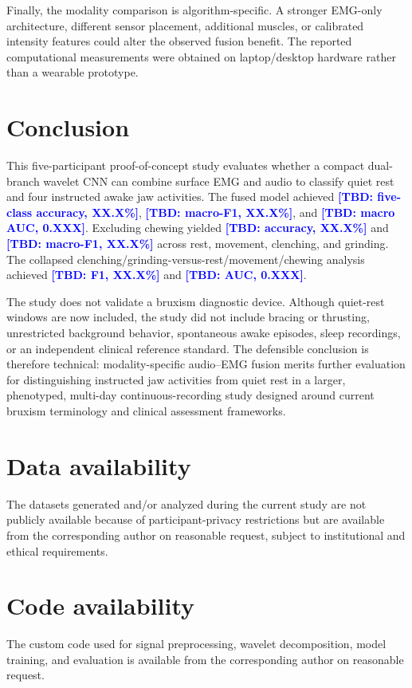 \documentclass[pdflatex,sn-nature,iicol]{sn-jnl}
\newcommand{\TBD}[1]{\textcolor{blue}{\textbf{[TBD: #1]}}}
\begin{document}
\color{blue}
Finally, the modality comparison is algorithm-specific. A stronger EMG-only architecture, different sensor placement, additional muscles, or calibrated intensity features could alter the observed fusion benefit. The reported computational measurements were obtained on laptop/desktop hardware rather than a wearable prototype.
\color{black}

\color{blue}
\section{Conclusion}
\color{black}

\color{blue}
This five-participant proof-of-concept study evaluates whether a compact dual-branch wavelet CNN can combine surface EMG and audio to classify quiet rest and four instructed awake jaw activities. The fused model achieved \TBD{five-class accuracy, XX.X\%}, \TBD{macro-F1, XX.X\%}, and \TBD{macro AUC, 0.XXX}. Excluding chewing yielded \TBD{accuracy, XX.X\%} and \TBD{macro-F1, XX.X\%} across rest, movement, clenching, and grinding. The collapsed clenching/grinding-versus-rest/movement/chewing analysis achieved \TBD{F1, XX.X\%} and \TBD{AUC, 0.XXX}.
\color{black}

\color{blue}
The study does not validate a bruxism diagnostic device. Although quiet-rest windows are now included, the study did not include bracing or thrusting, unrestricted background behavior, spontaneous awake episodes, sleep recordings, or an independent clinical reference standard. The defensible conclusion is therefore technical: modality-specific audio--EMG fusion merits further evaluation for distinguishing instructed jaw activities from quiet rest in a larger, phenotyped, multi-day continuous-recording study designed around current bruxism terminology and clinical assessment frameworks.
\color{black}

\color{blue}
\backmatter
\color{black}

\color{blue}
\section*{Data availability}
The datasets generated and/or analyzed during the current study are not publicly available because of participant-privacy restrictions but are available from the corresponding author on reasonable request, subject to institutional and ethical requirements.
\color{black}

\color{blue}
\section*{Code availability}
The custom code used for signal preprocessing, wavelet decomposition, model training, and evaluation is available from the corresponding author on reasonable request.
\color{black}
\end{document}

